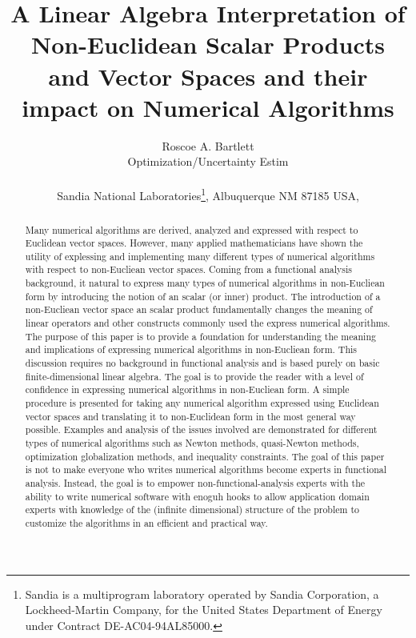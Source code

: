 \documentclass[pdf,ps2pdf,11pt]{SANDreport}
\title{\center
A Linear Algebra Interpretation of Non-Euclidean Scalar Products and Vector
Spaces and their impact on Numerical Algorithms}
\author{
Roscoe A. Bartlett \\ Optimization/Uncertainty Estim \\ \\ Sandia National
Laboratories\footnote{ Sandia is a multiprogram laboratory operated by Sandia
Corporation, a Lockheed-Martin Company, for the United States Department of
Energy under Contract DE-AC04-94AL85000.}, Albuquerque NM 87185 USA, \\ }
\date{}
\begin{document}
\maketitle

%

%
\begin{abstract}
%
Many numerical algorithms are derived, analyzed and expressed with respect to
Euclidean vector spaces.  However, many applied mathematicians have shown the
utility of explessing and implementing many different types of numerical
algorithms with respect to non-Eucliean vector spaces.  Coming from a
functional analysis background, it natural to express many types of numerical
algorithms in non-Eucliean form by introducing the notion of an scalar (or
inner) product.  The introduction of a non-Eucliean vector space an scalar
product fundamentally changes the meaning of linear operators and other
constructs commonly used the express numerical algorithms.  The purpose of
this paper is to provide a foundation for understanding the meaning and
implications of expressing numerical algorithms in non-Eucliean form.  This
discussion requires no background in functional analysis and is based purely
on basic finite-dimensional linear algebra.  The goal is to provide the reader
with a level of confidence in expressing numerical algorithms in non-Eucliean
form.  A simple procedure is presented for taking any numerical algorithm
expressed using Euclidean vector spaces and translating it to non-Euclidean
form in the most general way possible.  Examples and analysis of the issues
involved are demonstrated for different types of numerical algorithms such as
Newton methods, quasi-Newton methods, optimization globalization methods, and
inequality constraints.  The goal of this paper is not to make everyone who
writes numerical algorithms become experts in functional analysis.  Instead,
the goal is to empower non-functional-analysis experts with the ability to
write numerical software with enoguh hooks to allow application domain experts
with knowledge of the (infinite dimensional) structure of the problem to
customize the algorithms in an efficient and practical way.
%
\end{abstract}
%

%
\clearpage
\end{document}
